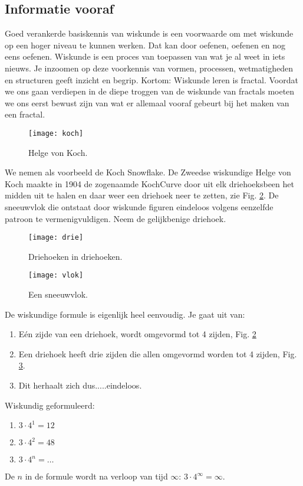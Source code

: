 \documentclass[11pt,fleqn]{book} %
\begin{document}
\subsection{Informatie vooraf}
Goed verankerde basiskennis van wiskunde is een voorwaarde om met wiskunde op een hoger niveau te kunnen werken. Dat kan door oefenen, oefenen en nog eens oefenen. Wiskunde is een proces van toepassen van wat je al weet in iets nieuws. Je inzoomen op deze voorkennis van vormen, processen, wetmatigheden en structuren geeft inzicht en begrip. Kortom: Wiskunde leren is fractal. 
Voordat we ons gaan verdiepen in de diepe troggen van de wiskunde van fractals moeten we ons eerst bewust zijn van wat er allemaal vooraf gebeurt bij het maken van een fractal. 
\begin{figure}[h]
	\centering\texttt{[image: koch]}
	\caption{Helge von Koch.}
	\label{fig:koch}
\end{figure}
We nemen als voorbeeld de Koch Snowflake. De Zweedse wiskundige Helge von Koch maakte in 1904 de zogenaamde KochCurve door uit elk driehoeksbeen het midden uit te halen en daar weer een driehoek neer te zetten, zie Fig. \ref{fig:drie}. De sneeuwvlok die ontstaat door wiskunde figuren eindeloos volgens eenzelfde patroon te vermenigvuldigen. Neem de gelijkbenige driehoek. 
\begin{figure}[h]
	\centering\texttt{[image: drie]}
	\caption{Driehoeken in driehoeken.}
	\label{fig:drie}
\end{figure}
\begin{figure}[h]
	\centering\texttt{[image: vlok]}
	\caption{Een sneeuwvlok.}
	\label{fig:vlok}
\end{figure}

De wiskundige formule is eigenlijk heel eenvoudig. Je gaat uit van: 
\begin{enumerate}
\item Eén zijde van een driehoek, wordt omgevormd tot 4 zijden, Fig. \ref{fig:drie}
\item Een driehoek heeft drie zijden die allen omgevormd worden tot 4 zijden, Fig. \ref{fig:vlok}. 
\item Dit herhaalt zich dus.....eindeloos.
\end{enumerate}
Wiskundig geformuleerd:
\begin{enumerate}
\item $3\cdot 4^1=12$
\item $3\cdot 4^2=48$
\item $3\cdot 4^n=\ldots$
\end{enumerate}
De $n$ in de formule wordt na verloop van tijd $\infty$: $3\cdot 4^\infty=\infty$.
\end{document}

